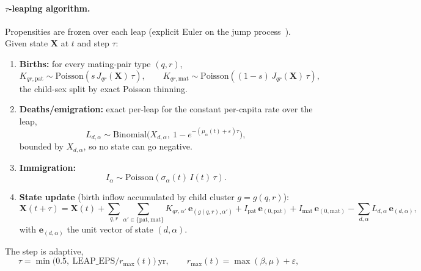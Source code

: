 \documentclass[11pt,a4paper]{article}
\begin{document}
\paragraph{$\tau$-leaping algorithm.}  Propensities are frozen over each
leap (explicit Euler on the jump process~\cite{gillespie-1976,gillespie-2001}).
Given state $\mathbf X$ at $t$ and step $\tau$:
\begin{enumerate}
  \item \textbf{Births:} for every mating-pair type $(q,r)$,
    \begin{equation}
      K_{qr,\mathrm{pat}} \sim \mathrm{Poisson}(s\,J_{qr}(\mathbf X)\,\tau),
      \qquad
      K_{qr,\mathrm{mat}} \sim \mathrm{Poisson}((1-s)\,J_{qr}(\mathbf X)\,\tau),
      \label{eq:stoch-leap-birth}
    \end{equation}
    the child-sex split by exact Poisson thinning.
  \item \textbf{Deaths/emigration:} exact per-leap for the constant
    per-capita rate over the leap,
    \begin{equation}
      L_{d,\alpha} \sim \mathrm{Binomial}\!\big(X_{d,\alpha},\
        1-e^{-(\mu_\alpha(t)+\varepsilon)\tau}\big),
      \label{eq:stoch-leap-death}
    \end{equation}
    bounded by $X_{d,\alpha}$, so no state can go negative.
  \item \textbf{Immigration:}
    \begin{equation}
      I_\alpha \sim \mathrm{Poisson}(\sigma_\alpha(t)\,I(t)\,\tau).
      \label{eq:stoch-leap-imm}
    \end{equation}
  \item \textbf{State update} (birth inflow accumulated by child
    cluster $g=g(q,r)$):
    \begin{equation}
      \mathbf X(t+\tau) = \mathbf X(t)
        + \sum_{q,r}\sum_{\alpha'\in\{\mathrm{pat},\mathrm{mat}\}}
          K_{qr,\alpha'}\,\mathbf e_{(g(q,r),\alpha')}
        + I_{\mathrm{pat}}\,\mathbf e_{(0,\mathrm{pat})}
        + I_{\mathrm{mat}}\,\mathbf e_{(0,\mathrm{mat})}
        - \sum_{d,\alpha} L_{d,\alpha}\,\mathbf e_{(d,\alpha)},
      \label{eq:stoch-leap-update}
    \end{equation}
    with $\mathbf e_{(d,\alpha)}$ the unit vector of state $(d,\alpha)$.
\end{enumerate}
The step is adaptive,
\begin{equation}
  \tau = \min\big(0.5,\ \mathrm{LEAP\_EPS}/r_{\max}(t)\big)\ \mathrm{yr},
  \qquad r_{\max}(t) = \max(\beta,\mu)+\varepsilon,
  \label{eq:stoch-tau}
\end{equation}
\end{document}
